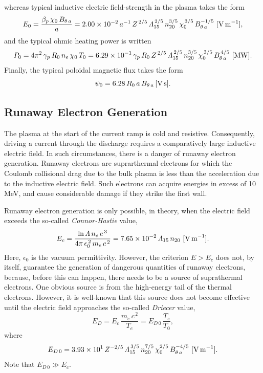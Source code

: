 \documentclass[12pt,prb,aps]{revtex4-1}
\begin{document}
 whereas typical inductive electric field-strength in the plasma takes the form
 \begin{equation}
 E_0 =\frac{\beta_p\,\chi_0\,B_{\theta\,a}}{a} = 2.00\times 10^{-2}\,a^{-1}\,Z^{\,2/5}\,{\mit\Lambda}_{15}^{\,2/5}\,n_{20}^{3/5}\,\chi_0^{\,3/5}\,B_{\theta\,a}^{-1/5}\,\,[{\rm V\,m}^{-1}],
 \end{equation}
 and the typical ohmic heating power is written
 \begin{equation}
 P_0 = 4\pi^2\,\gamma_p\,R_0\,n_e\,\chi_0\,T_0 = 6.29\times 10^{-1}\,\gamma_p\,R_0\,Z^{\,2/5}\,{\mit\Lambda}_{15}^{\,2/5}\,n_{20}^{3/5}\,\chi_0^{\,3/5}\,B_{\theta\,a}^{\,4/5}\,\,[{\rm MW}].
 \end{equation}
 Finally, the typical poloidal magnetic flux takes the form 
 \begin{equation}
 \psi_0= 6.28\,R_0\,a\,B_{\theta\,a}\,[{\rm V\,s}].
 \end{equation}
 
\subsection{Runaway Electron Generation}
 The plasma at the start of the current ramp is cold and resistive. Consequently, driving a current through the discharge requires a comparatively large inductive electric field. In such 
 circumstances, there is a danger of runaway electron generation. Runaway electrons are suprarthermal electrons for which the Coulomb collisional drag due to the bulk plasma is
 less than the acceleration due to the inductive electric field. Such electrons can acquire energies in excess of 10 MeV, and  cause considerable damage if they strike the 
 first wall. 
 
 Runaway electron generation is only possible, in theory,  when the electric field exceeds the so-called {\em Connor-Hastie}\/ value,\cite{connor}
 \begin{equation}
 E_c = \frac{\ln{\mit\Lambda}\,n_e\,e^{\,3}}{4\pi\,\epsilon_0^{\,2}\,m_e\,c^{\,2}} = 7.65\times 10^{-2}\,{\mit\Lambda}_{15}\,n_{20}\,\,[{\rm V\,m}^{-1}].
 \end{equation}
 Here, $\epsilon_0$ is the vacuum permittivity. 
 However, the criterion $E>E_c$ does not,  by itself, guarantee the generation of dangerous quantities of runaway electrons, because, before this
 can happen, there needs to be a source of suprathermal electrons. One obvious source is from the high-energy tail of the thermal electrons. However,
 it is well-known that this source does not become effective until the electric field approaches the so-called {\em Driecer}\/ value,\cite{dreicer}
 \begin{equation}
 E_D = E_c\,\frac{m_e\,c^{\,2}}{T_e}= E_{D\,0}\,\frac{T_e}{T_0},
 \end{equation}
 where
 \begin{equation}
 E_{D\,0} = 3.93\times 10^{1}\,Z^{-2/5}\,{\mit\Lambda}_{15}^{\,3/5}\,n_{20}^{7/5}\,\chi_0^{2/5}\,B_{\theta\,a}^{-4/5}\,\,[{\rm V\,m}^{-1}].
 \end{equation}
 Note that $E_{D\,0}\gg E_c$. 
 
\end{document}
